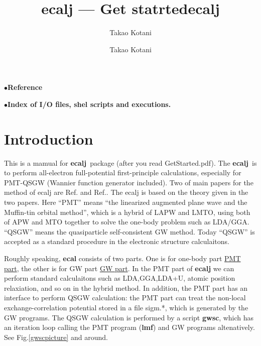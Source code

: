 \documentclass[a4paper,10pt,epsf,fleqn]{article}
\author{Takao Kotani}
\title{ecalj --- Get statrted}
\newcommand{\exe}[1]{{\bf #1}}
\newcommand{\io}[1]{{\sf  #1}}
\newcommand{\ecalj}{{\bf ecalj}\ }
\begin{document}
\baselineskip=6mm
\title{ \exe{ecalj}}
\author{Takao Kotani}
\maketitle
\tableofcontents

\vspace{5mm}
\noindent$\bullet${\bf Reference}

\vspace{5mm}
\noindent$\bullet${\bf Index of I/O files, shel scripts and executions.}

\newpage

\section{Introduction}
This is a mamual for \ecalj package (after you read GetStarted.pdf).
The \ecalj is to perform all-electron full-potential 
first-principle calculations, especially for PMT-QSGW 
(Wannier function generator included).
Two of main papers for the method of ecalj are
Ref.\cite{kotani2015pmt} and Ref.\cite{kotani_quasiparticle_2014}.
The ecalj is based on the theory given in the two papers.
Here ``PMT'' means ``the linearized augmented plane wave and 
the Muffin-tin orbital method'', which 
is a hybrid of LAPW and LMTO, using both of APW and MTO together 
to solve the one-body problem such as LDA/GGA.
``QSGW'' means the quasiparticle self-consistent GW method.
Today ``QSGW'' is accepted as a standard procedure in the electronic
structure calculaitons.

Roughly speaking, \exe{ecal} consists of two parts.
One is for one-body part \underline{PMT part}, 
the other is for GW part \underline{GW part}.
In the PMT part of \exe{ecalj} \cite{pmt1,kotani_linearized_2013,kotani2015pmt}
we can perform standard calculaitons such
as LDA,GGA,LDA+U, atomic position relaxiation, and so on
in the hybrid method.
In addition, the PMT part has an interface to perform QSGW calculation:
the PMT part can treat the non-local
exchange-correlation potential stored in a file \io{sigm.*},
which is generated by the GW programs.
The QSGW calculation is performed by a script \exe{gwsc}, which
has an iteration loop calling the PMT program (\exe{lmf}) and GW
programs altenatively. See Fig.\ref{gwscpicture} and around.\\
\end{document}
